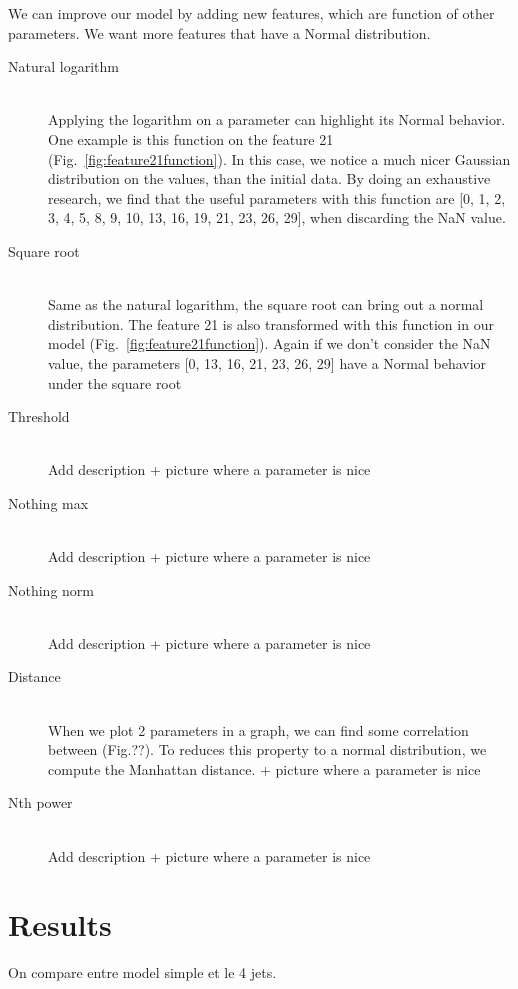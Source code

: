\documentclass[10pt,conference,compsocconf]{IEEEtran}
\begin{document}
	We can improve our model by adding new features, which are function of other parameters. We want more features that have a Normal distribution. 
	\begin{description}
		\item[Natural logarithm] \ \\
		Applying the logarithm on a parameter can highlight its Normal behavior. One example is this function on the feature 21 (Fig.~\ref{fig:feature21function}). In this case, we notice a much nicer Gaussian distribution on the values, than the initial data. By doing an exhaustive research, we find that the useful parameters with this function are [0, 1, 2, 3, 4, 5, 8, 9, 10, 13, 16, 19, 21, 23, 26, 29], when discarding the NaN value.
		\item[Square root] \ \\
		Same as the natural logarithm, the square root can bring out a normal distribution. The feature 21 is also transformed with this function in our model (Fig.~\ref{fig:feature21function}). Again if we don't consider the NaN value, the parameters [0, 13, 16, 21, 23, 26, 29] have a Normal behavior under the square root
		\item[Threshold] \ \\
		Add description + picture where a parameter is nice
		\item[Nothing max] \ \\
		Add description + picture where a parameter is nice
		\item[Nothing norm] \ \\
		Add description + picture where a parameter is nice
		\item[Distance] \ \\
		When we plot 2 parameters in a graph, we can find some correlation between (Fig.??). To reduces this property to a normal distribution, we compute the Manhattan distance. + picture where a parameter is nice
		\item[Nth power] \ \\
		Add description + picture where a parameter is nice
	\end{description}
	\section{Results}
	On compare entre model simple et le 4 jets.
	
\end{document}
